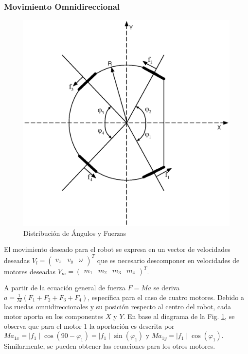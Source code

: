 \documentclass[twocolumn,10pt]{amrob}
\begin{document}
\subsubsection*{Movimiento Omnidireccional}
\label{subsec:mov_omni}
\begin{figure}
  \centering
    \includegraphics[scale=0.4]{anglesRobot.eps}
  \caption{Distribución de Ángulos y Fuerzas}
  \label{fig:angFzaDiag}
\end{figure}
El movimiento deseado para el robot se expresa en un vector de velocidades deseadas \( V_l= \begin{pmatrix} v_x & v_y & \omega \end{pmatrix}^{T} \) que es necesario descomponer en velocidades de motores deseadas \( V_m= \begin {pmatrix} m_1 & m_2 & m_3 & m_4 \end{pmatrix}^{T} \). 

A partir de la ecuación general de fuerza \( F = Ma \) se deriva $ a = \frac{1}{M}\left(F_1+F_2+F_3+F_4\right)$, específica para el caso de cuatro motores. Debido a las ruedas omnidireccionales y su posición respecto al centro del robot, cada motor aporta en los componentes $X$ y $Y$. En base al diagrama de la Fig. \ref{fig:angFzaDiag}, se observa que para el motor 1 la aportación es descrita por $Ma_{1x} = \mid f_1 \mid \cos\left(90 - \varphi_1\right) =  \mid f_1 \mid  \sin\left(\varphi_1\right)$ y $Ma_{1y} = \mid f_1 \mid \cos\left(\varphi_1\right)$. Similarmente, se pueden obtener las ecuaciones para los otros motores.
\end{document}
